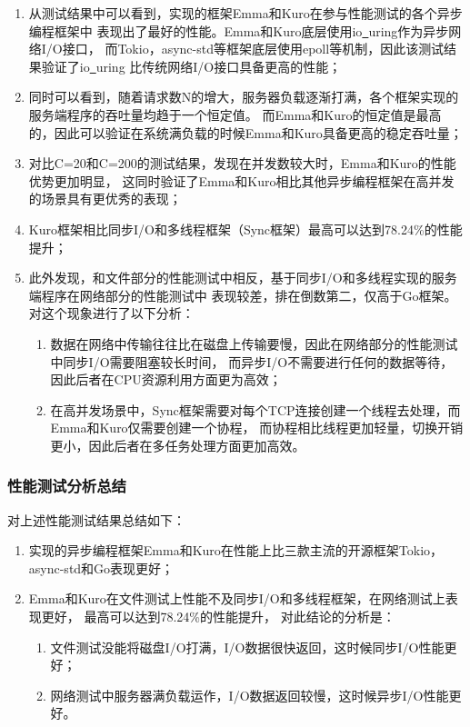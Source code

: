 \documentclass[supercite]{HustGraduPaper}
\theoremstyle{definition}
\begin{document}
\begin{enumerate}[label={(\arabic*)}]
  \item 从测试结果中可以看到，实现的框架Emma和Kuro在参与性能测试的各个异步编程框架中
    表现出了最好的性能。Emma和Kuro底层使用io\underline{~}uring作为异步网络I/O接口，
    而Tokio，async-std等框架底层使用epoll等机制，因此该测试结果验证了io\underline{~}uring
    比传统网络I/O接口具备更高的性能；
  \item 同时可以看到，随着请求数N的增大，服务器负载逐渐打满，各个框架实现的服务端程序的吞吐量均趋于一个恒定值。
    而Emma和Kuro的恒定值是最高的，因此可以验证在系统满负载的时候Emma和Kuro具备更高的稳定吞吐量；
  \item 对比C=20和C=200的测试结果，发现在并发数较大时，Emma和Kuro的性能优势更加明显，
    这同时验证了Emma和Kuro相比其他异步编程框架在高并发的场景具有更优秀的表现；
  \item Kuro框架相比同步I/O和多线程框架（Sync框架）最高可以达到78.24\%的性能提升；
  \item 此外发现，和文件部分的性能测试中相反，基于同步I/O和多线程实现的服务端程序在网络部分的性能测试中
    表现较差，排在倒数第二，仅高于Go框架。
    对这个现象进行了以下分析：
    \begin{enumerate}
      \item 数据在网络中传输往往比在磁盘上传输要慢，因此在网络部分的性能测试中同步I/O需要阻塞较长时间，
        而异步I/O不需要进行任何的数据等待，因此后者在CPU资源利用方面更为高效；
      \item 在高并发场景中，Sync框架需要对每个TCP连接创建一个线程去处理，而Emma和Kuro仅需要创建一个协程，
        而协程相比线程更加轻量，切换开销更小，因此后者在多任务处理方面更加高效。
    \end{enumerate}
\end{enumerate}

\subsubsection{性能测试分析总结}
对上述性能测试结果总结如下：

\begin{enumerate}[label={(\arabic*)}]
  \item 实现的异步编程框架Emma和Kuro在性能上比三款主流的开源框架Tokio，async-std和Go表现更好；
  \item Emma和Kuro在文件测试上性能不及同步I/O和多线程框架，在网络测试上表现更好，
    最高可以达到78.24\%的性能提升，
    对此结论的分析是：
    \begin{enumerate}
      \item 文件测试没能将磁盘I/O打满，I/O数据很快返回，这时候同步I/O性能更好；
      \item 网络测试中服务器满负载运作，I/O数据返回较慢，这时候异步I/O性能更好。
    \end{enumerate}
\end{enumerate}
\end{document}
